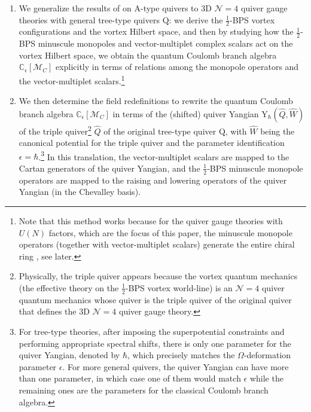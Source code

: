 \documentclass[12pt,a4paper]{article}
\renewcommand{\(}{\left(}
\renewcommand{\)}{\right)}
\newcommand{\eps}{\epsilon}
\renewcommand{\(}{\left(}
\renewcommand{\)}{\right)}
\begin{document}
\begin{enumerate}
\item 
We generalize the results  of  \cite{Bullimore:2016hdc} on A-type quivers to 3D $\mathcal{N}=4$ quiver gauge theories with general tree-type quivers $\mathrm{Q}$: we derive the $\frac{1}{2}$-BPS vortex configurations and the vortex Hilbert space, and then by studying how the $\frac{1}{2}$-BPS minuscule monopoles and vector-multiplet complex scalars act on the vortex Hilbert space, we obtain the quantum Coulomb branch algebra $\mathbb{C}_{\eps}[\mathcal{M}_C]$  explicitly in terms of relations among the monopole operators and the vector-multiplet scalars.\footnote{Note that this method works because for the quiver gauge theories with $U(N)$ factors, which are the focus of this paper, the minuscule monopole operators (together with vector-multiplet scalars) generate the entire chiral ring \cite{bullimore2015coulomb,Braverman:2016wma}, see later.} 
\item We then determine the field redefinitions to rewrite the quantum Coulomb branch algebra $\mathbb{C}_{\eps}[\mathcal{M}_C]$ in terms of the (shifted) quiver Yangian 
Y$_{\hbar}(\widehat{Q},\widehat{W})$  
of the triple quiver\footnote{Physically, the triple quiver appears because the vortex quantum mechanics (the effective theory on the $\frac{1}{2}$-BPS vortex world-line) is an $\mathcal{N}=4$ quiver quantum mechanics whose quiver is the triple quiver of the original quiver that defines the 3D $\mathcal{N}=4$ quiver gauge theory.} $\widehat{Q}$ of the original tree-type quiver $\mathrm{Q}$, with $\widehat{W}$ being the canonical potential for the triple quiver \cite{Ginzburg:2006fu} and the parameter identification $\eps=\hbar$.\footnote{For tree-type theories, after imposing the superpotential constraints and performing appropriate spectral shifts, there is only one parameter for the quiver Yangian, denoted by $\hbar$, which precisely matches the $\Omega$-deformation parameter $\epsilon$. 
For more general quivers, the quiver Yangian can have more than one parameter, in which case one of them would match $\epsilon$ while the remaining ones are the parameters for the classical Coulomb branch algebra.} 
In this translation, the vector-multiplet scalars are mapped to the Cartan generators of the quiver Yangian, and the $\frac{1}{2}$-BPS minuscule monopole operators are mapped to the raising and lowering operators of the quiver Yangian (in the Chevalley basis).
\end{enumerate}
\end{document}
